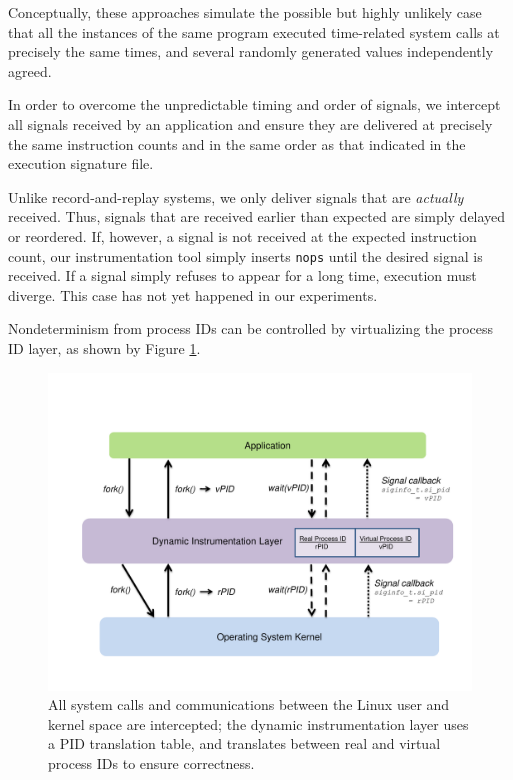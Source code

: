 Conceptually, these approaches simulate the possible but highly
unlikely case that all the instances of the same program
executed time-related system calls
at precisely the same times,
and several randomly generated values independently agreed. \newline

 \newline
In order to overcome the unpredictable timing and 
order of signals, we intercept all signals received by 
an application and ensure they are delivered
at precisely the same instruction counts
and in the same order as that indicated
in the execution signature file.

Unlike record-and-replay systems, we only
deliver signals that are {\em actually}
received. Thus, signals that are received earlier
than expected are simply delayed or reordered. If,
however, a signal is not received at the expected
instruction count, our instrumentation tool
simply inserts \texttt{nops} until the 
desired signal is received. If a signal simply
refuses to appear for a long time, execution
must diverge. This case has not yet happened
in our experiments. \newline

 \newline
Nondeterminism from process IDs
can be controlled by virtualizing the process ID
layer, as shown by Figure \ref{ch3:pidfig}.

\begin{figure}[h]
  \center
  \includegraphics[trim=0cm 1cm 0cm 0.5cm, scale=0.60]{pid.pdf}
  \caption[Virtualizing the process ID layer using Pin]%
  {All system calls and communications
  between the Linux user and kernel space are intercepted; 
  the dynamic instrumentation layer
  uses a PID translation table, and
  translates between real and virtual process IDs
  to ensure correctness. }
  
  \label{ch3:pidfig}
\end{figure} 

